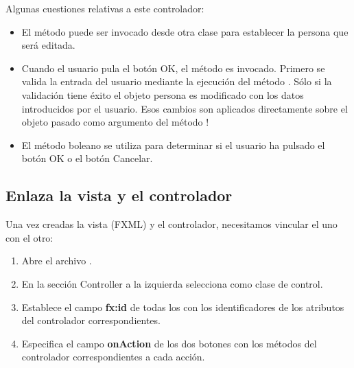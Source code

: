 Algunas cuestiones relativas a este controlador:
\begin{itemize}
    \item El método  puede ser invocado desde otra clase para establecer la 
    persona que será editada.
    \item Cuando el usuario pula el botón OK, el método  es invocado. Primero se valida la 
    entrada del usuario mediante la ejecución del método . Sólo si la validación tiene 
    éxito el objeto persona es modificado con los datos introducidos por el usuario. 
    Esos cambios son aplicados directamente sobre el objeto pasado como argumento del método !
    \item El método boleano  se utiliza para determinar si el usuario ha pulsado el 
    botón OK o el botón Cancelar.
\end{itemize}

\subsection{Enlaza la vista y el controlador}
Una vez creadas la vista (FXML) y el controlador, necesitamos vincular el uno con el otro:
\begin{enumerate}
    \item Abre el archivo .
    \item En la sección Controller a la izquierda selecciona  
    como clase de control.
    \item Establece el campo \textbf{fx:id} de todas los  con los identificadores de los 
    atributos del controlador correspondientes.
    \item Especifica el campo \textbf{onAction} de los dos botones con los métodos del controlador correspondientes a 
    cada acción.
\end{enumerate}
